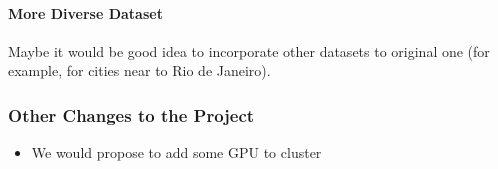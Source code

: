 \paragraph{More Diverse Dataset}Maybe it would be good idea to incorporate other datasets to original one (for example, for cities near to Rio de Janeiro).


\subsubsection*{Other Changes to the Project}

\begin{itemize}
  \item We would propose to add some GPU to cluster
\end{itemize}